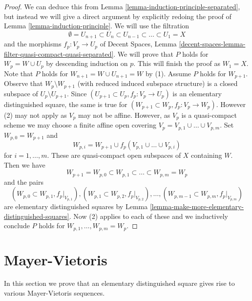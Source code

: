 \begin{proof}
We can deduce this from Lemma \ref{lemma-induction-principle-separated},
but instead we will give a direct argument by explicitly redoing the proof of
Lemma \ref{lemma-induction-principle}. We will use the filtration
$$
\emptyset = U_{n + 1} \subset
U_n \subset U_{n - 1} \subset \ldots \subset U_1 = X
$$
and the morphisms $f_p : V_p \to U_p$ of
Decent Spaces, Lemma
\ref{decent-spaces-lemma-filter-quasi-compact-quasi-separated}.
We will prove that $P$ holds for $W_p = W \cup U_p$ by descending
induction on $p$. This will finish the proof as $W_1 = X$.
Note that $P$ holds for $W_{n + 1} = W \cup U_{n + 1} = W$
by (1). Assume $P$ holds for $W_{p + 1}$. Observe that
$W_p \setminus W_{p + 1}$ (with reduced induced subspace structure)
is a closed subspace of $U_p \setminus U_{p + 1}$.
Since $(U_{p + 1} \subset U_p, f_p : V_p \to U_p)$ is an elementary
distinguished square, the same is true for
$(W_{p + 1} \subset W_p, f_p : V_p \to W_p)$.
However (2) may not apply as $V_p$ may not be affine.
However, as $V_p$ is a quasi-compact scheme we may choose
a finite affine open covering $V_p = V_{p, 1} \cup \ldots \cup V_{p, m}$.
Set $W_{p, 0} = W_{p + 1}$ and
$$
W_{p, i} = W_{p + 1} \cup f_p(V_{p, 1} \cup \ldots \cup V_{p, i})
$$
for $i = 1, \ldots, m$. These are quasi-compact open subspaces of $X$
containing $W$. Then we have
$$
W_{p + 1} = W_{p, 0} \subset
W_{p, 1} \subset \ldots \subset
W_{p, m} = W_p
$$
and the pairs
$$
(W_{p, 0} \subset W_{p, 1}, f_p|_{V_{p, 1}}),
(W_{p, 1} \subset W_{p, 2}, f_p|_{V_{p, 2}}),\ldots,
(W_{p, m - 1} \subset W_{p, m}, f_p|_{V_{p, m}})
$$
are elementary distinguished squares by
Lemma \ref{lemma-make-more-elementary-distinguished-squares}.
Now (2) applies to each of these and we inductively
conclude $P$ holds for $W_{p, 1}, \ldots, W_{p, m} = W_p$.
\end{proof}



\section{Mayer-Vietoris}
\label{section-mayer-vietoris}

\noindent
In this section we prove that an elementary distinguished square
gives rise to various Mayer-Vietoris sequences.

